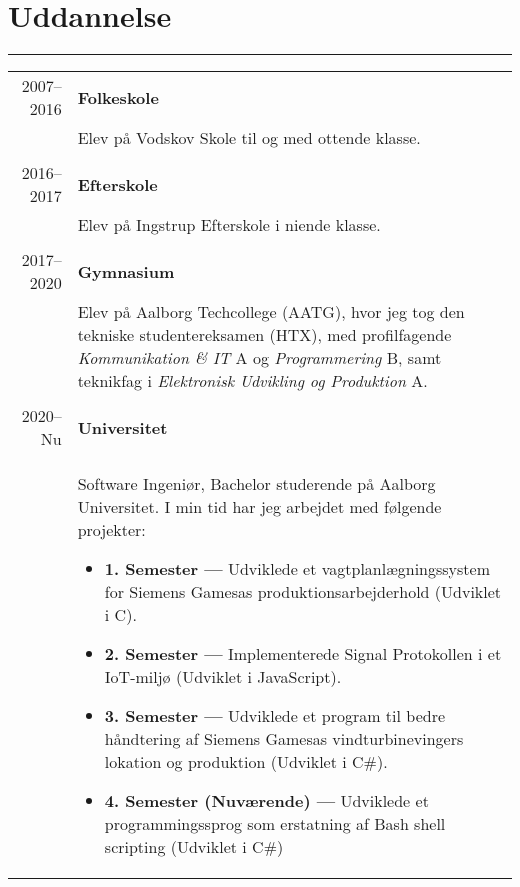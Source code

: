 \documentclass{article}
\begin{document}
\section*{Uddannelse}
\hrule width5cm
\begin{longtabu} to \textwidth {r|X}
2007--2016 & \textbf{Folkeskole}\\
&   Elev på Vodskov Skole til og med ottende klasse.
    \\\\
2016--2017 & \textbf{Efterskole}\\
&   Elev på Ingstrup Efterskole i niende klasse.
    \\\\
2017--2020 & \textbf{Gymnasium}\\
&   Elev på Aalborg Techcollege (AATG), hvor jeg tog den tekniske studentereksamen (HTX),
    med profilfagende \textit{Kommunikation \& IT} A og \textit{Programmering} B, samt teknikfag i \textit{Elektronisk Udvikling og Produktion} A.
    \\\\
2020--Nu & \textbf{Universitet}\\
&   Software Ingeniør, Bachelor studerende på Aalborg Universitet. I min tid har jeg arbejdet
    med følgende projekter:
    \begin{itemize}\setlength\itemsep{0em}
        \item[] \textbf{1. Semester --- } Udviklede et vagtplanlægningssystem for Siemens Gamesas
            produktionsarbejderhold (Udviklet i C).
        \item[] \textbf{2. Semester --- } Implementerede Signal Protokollen i et IoT-miljø
            (Udviklet i JavaScript).
        \item[] \textbf{3. Semester --- } Udviklede et program til bedre håndtering
            af Siemens Gamesas vindturbinevingers lokation og produktion (Udviklet i C\#).
        \item[] \textbf{4. Semester (Nuværende) --- } Udviklede et programmingssprog som erstatning
            af Bash shell scripting (Udviklet i C\#)
    \end{itemize}
\end{longtabu}
\end{document}
